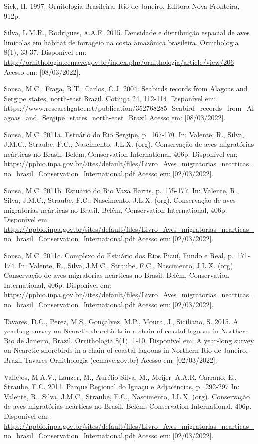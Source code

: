 \documentclass[
  oneside]{scrbook}
\begin{document}
Sick, H. 1997. Ornitologia Brasileira. Rio de Janeiro, Editora Nova Fronteira, 912p.

Silva, L.M.R., Rodrigues, A.A.F. 2015. Densidade e distribuição espacial de aves limícolas em habitat de forrageio na costa amazônica brasileira. Ornithologia 8(1), 33-37. Disponível em: \url{http://ornithologia.cemave.gov.br/index.php/ornithologia/article/view/206} Acesso em: {[}08/03/2022{]}.

Sousa, M.C., Fraga, R.T., Carlos, C.J. 2004. Seabirds records from Alagoas and Sergipe states, north-east Brazil. Cotinga 24, 112-114. Disponível em: \url{https://www.researchgate.net/publication/352768285_Seabird_records_from_Alagoas_and_Sergipe_states_north-east_Brazil} Acesso em: {[}08/03/2022{]}.

Sousa, M.C. 2011a. Estuário do Rio Sergipe, p.~167-170. In: Valente, R., Silva, J.M.C., Straube, F.C., Nascimento, J.L.X. (org). Conservação de aves migratórias neárticas no Brasil. Belém, Conservation International, 406p. Disponível em: \url{https://ppbio.inpa.gov.br/sites/default/files/Livro_Aves_migratorias_nearticas_no_brasil_Conservation_International.pdf} Acesso em: {[}02/03/2022{]}.

Sousa, M.C. 2011b. Estuário do Rio Vaza Barris, p.~175-177. In: Valente, R., Silva, J.M.C., Straube, F.C., Nascimento, J.L.X. (org). Conservação de aves migratórias neárticas no Brasil. Belém, Conservation International, 406p. Disponível em: \url{https://ppbio.inpa.gov.br/sites/default/files/Livro_Aves_migratorias_nearticas_no_brasil_Conservation_International.pdf} Acesso em: {[}02/03/2022{]}.

Sousa, M.C. 2011c. Complexo do Estuário dos Rios Piauí, Fundo e Real, p.~171-174. In: Valente, R., Silva, J.M.C., Straube, F.C., Nascimento, J.L.X. (org). Conservação de aves migratórias neárticas no Brasil. Belém, Conservation International, 406p. Disponível em: \url{https://ppbio.inpa.gov.br/sites/default/files/Livro_Aves_migratorias_nearticas_no_brasil_Conservation_International.pdf} Acesso em: {[}02/03/2022{]}.

Tavares, D.C., Perez, M.S., Gonçalvez, M.P., Moura, J., Siciliano, S. 2015. A yearlong survey on Nearctic shorebirds in a chain of coastal lagoons in Northern Rio de Janeiro, Brazil. Ornithologia 8(1), 1-10. Disponível em: A year-long survey on Nearctic shorebirds in a chain of coastal lagoons in Northern Rio de Janeiro, Brazil \textbar{} Tavares \textbar{} Ornithologia (cemave.gov.br) Acesso em: {[}02/03/2022{]}.

Vallejos, M.A.V., Lanzer, M., Aurélio-Silva, M., Meijer, A.A.R. Carrano, E., Straube, F.C. 2011. Parque Regional do Iguaçu e Adjacências, p.~292-297 In: Valente, R., Silva, J.M.C., Straube, F.C., Nascimento, J.L.X. (org). Conservação de aves migratórias neárticas no Brasil. Belém, Conservation International, 406p. Disponível em: \url{https://ppbio.inpa.gov.br/sites/default/files/Livro_Aves_migratorias_nearticas_no_brasil_Conservation_International.pdf} Acesso em: {[}02/03/2022{]}.
\end{document}
